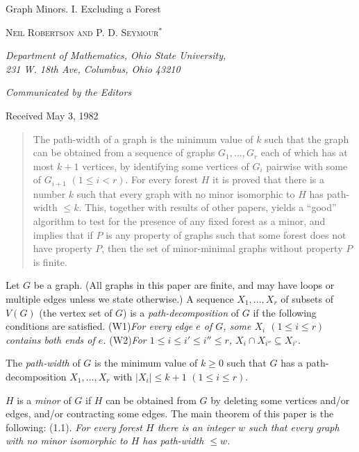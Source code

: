 {\centering
\medskip
{\Large Graph Minors. I. Excluding a Forest\par}
{\textsc{Neil Robertson and P. D. Seymour}$^*$\par}
{\itshape Department of Mathematics, Ohio State University,\\
231 W. 18th Ave, Columbus, Ohio 43210\par}
{\itshape Communicated by the Editors\par}
{Received May 3, 1982\par}
}

\begin{quote}
The path-width of a graph is the minimum value of $k$ such that the graph can be
obtained from a sequence of graphs $G_1,..., G_r$ each of which has at most $k+1$
vertices, by identifying some vertices of $G_i$ pairwise with some of $G_{i+1}$ $(1\le i<r)$.
For every forest $H$ it is proved that there is a number $k$ such that every graph with
no minor isomorphic to $H$ has path-width $\le k$. This, together with results of other
papers, yields a ``good'' algorithm to test for the presence of any fixed forest as a
minor, and implies that if $P$ is any property of graphs such that some forest does
not have property $P$, then the set of minor-minimal graphs without property $P$ is
finite.
\end{quote}


Let $G$ be a graph. (All graphs in this paper are finite, and may have loops
or multiple edges unless we state otherwise.) A sequence $X_1,..., X_r$ of subsets
of $V(G)$ (the vertex set of $G$) is a \textit{path-decomposition} of $G$ if the following
conditions are satisfied.
\stmt
\hspace*{24pt}(W1)\quad \textit{For every edge $e$ of $G$, some $X_i$ $(1\le i\le r)$ contains both ends
of $e$.}
\stmt
\hspace*{24pt}(W2)\quad \textit{For $1\le i\le i'\le i''\le r$, $X_i\cap X_{i''}\subseteq X_{i'}$.}

\noindent The \textit{path-width} of $G$ is the minimum value of $k\ge 0$ such that $G$ has a path-decomposition $X_1,..., X_r$ with $|X_i|\le k+1$ $(1\le i\le r)$.

\noindent\hspace*{6pt}$H$ is a \textit{minor} of $G$ if $H$ can be obtained from $G$ by deleting some vertices
and/or edges, and/or contracting some edges. The main theorem of this
paper is the following:
\stmt
(1.1). \textit{For every forest $H$ there is an integer $w$ such that every graph with
no minor isomorphic to $H$ has path-width $\le w$.}%
\begingroup\renewcommand{\thefootnote}{$*$}%
\endgroup
